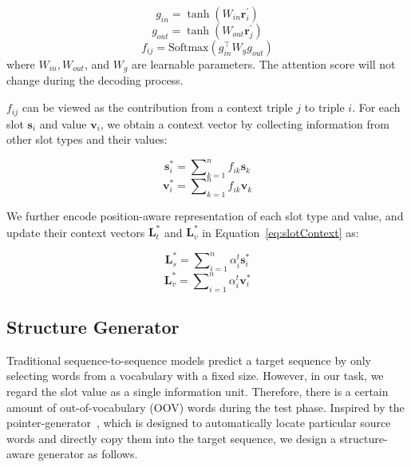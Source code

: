 \documentclass[11pt,a4paper]{article}
\begin{document}
\begin{displaymath}
g_{in}=\tanh{\left(W_{in} \textbf{r}_{i}^{'}\right)}
\end{displaymath}
\begin{displaymath}
g_{out}=\tanh{\left(W_{out} \textbf{r}_{j}^{'}\right)}
\end{displaymath}
\begin{displaymath}
f_{ij}= \text{Softmax} \left( g_{in}^{\top}W_g g_{out}\right)
\end{displaymath}
where $W_{in}, W_{out}$, and $W_g$ are learnable parameters.
The attention score will not change during the decoding process. 

$f_{ij}$ can be viewed as the contribution from a context triple $j$ to triple $i$. For each slot $\textbf{s}_i$ and value $\textbf{v}_i$, we obtain a context vector by collecting information from other slot types and their values:

\begin{displaymath}
\textbf{s}_{i}^{*}=\sum\nolimits_{k=1}^{n} f_{ik} \textbf{s}_{k}
\end{displaymath}
\begin{displaymath}
\textbf{v}_{i}^{*}=\sum\nolimits_{k=1}^{n} f_{ik} \textbf{v}_{k}
\end{displaymath} 

We further encode position-aware representation of each slot type and value, and update their context vectors $\textbf{L}_{t}^{*}$ and $\textbf{L}_{v}^{*}$ in Equation~\ref{eq:slotContext} as:

\begin{displaymath}
\textbf{L}_{s}^{*} =\sum\nolimits_{i=1}^{n} \alpha^{t}_{i}\textbf{s}_{i}^{*}
\end{displaymath}
\begin{displaymath}
\textbf{L}_{v}^{*} =\sum\nolimits_{i=1}^{n} \alpha^{t}_{i} \textbf{v}_{i}^{*}
\end{displaymath}







\subsection{Structure Generator}

Traditional sequence-to-sequence models predict a target sequence by only selecting words from a vocabulary with a fixed size. However, in our task, we regard the slot value as a single information unit. Therefore, there is a certain amount of out-of-vocabulary (OOV) words during the test phase. Inspired by the pointer-generator~\cite{copy16,hybridp17}, which is designed to automatically locate particular source words and directly copy them into the target sequence, we design a structure-aware generator as follows.
\end{document}
